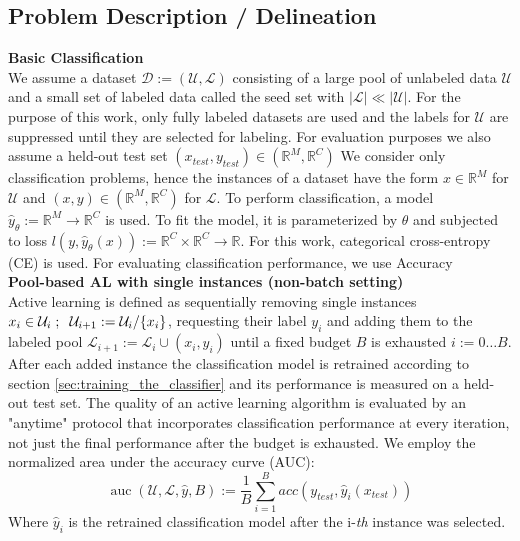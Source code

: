 \documentclass[]{article}
\begin{document}
\subsection{Problem Description / Delineation}
\textbf{Basic Classification}\\
We assume a dataset $\mathcal{D} := (\mathcal{U}, \mathcal{L})$ consisting of a large pool of unlabeled data $\mathcal{U}$ and a small set of labeled data called the seed set with $|\mathcal{L}| \ll |\mathcal{U|}$. 
For the purpose of this work, only fully labeled datasets are used and the labels for $\mathcal{U}$ are suppressed until they are selected for labeling.
For evaluation purposes we also assume a held-out test set $(x_{test}, y_{test}) \in (\mathbb{R}^M, \mathbb{R}^C)$
We consider only classification problems, hence the instances of a dataset have the form $x \in \mathbb{R}^M$ for $\mathcal{U}$ and $(x, y) \in (\mathbb{R}^M, \mathbb{R}^C)$ for $\mathcal{L}$.
To perform classification, a model $\hat y_\theta := \mathbb{R}^M \rightarrow \mathbb{R}^C$ is used. To fit the model, it is parameterized by $\theta$ and subjected to loss $l(y, \hat y_\theta(x)) := \mathbb{R}^C \times \mathbb{R}^C \rightarrow \mathbb{R}$. For this work, categorical cross-entropy (CE) is used.
For evaluating classification performance, we use Accuracy \\ [1mm]
%
\textbf{Pool-based AL with single instances (non-batch setting)}\\
Active learning is defined as sequentially removing single instances $x_i \in \mathcal{U}_i\hspace{1mm}; \hspace{2mm} \mathcal{U}_{i+1} := \mathcal{U}_i / \{x_i\}$, requesting their label $y_i$ and adding them to the labeled pool $\mathcal{L}_{i+1} := \mathcal{L}_i \cup (x_i, y_i)$ until a fixed budget $B$ is exhausted $i := 0 \ldots B$.
After each added instance the classification model is retrained according to section \ref{sec:training_the_classifier} and its performance is measured on a held-out test set.
The quality of an active learning algorithm is evaluated by an "anytime" protocol that incorporates classification performance at every iteration, not just the final performance after the budget is exhausted.
We employ the normalized area under the accuracy curve (AUC):
\begin{equation}
	\operatorname{auc}(\mathcal{U}, \mathcal{L}, \hat y, B) := \frac{1}{B} \sum_{i=1}^{B} acc(y_{test}, \hat y_i(x_{test}))
\end{equation}
Where $\hat y_i$ is the retrained classification model after the i-\textit{th} instance was selected. \\ [1mm]
\end{document}
